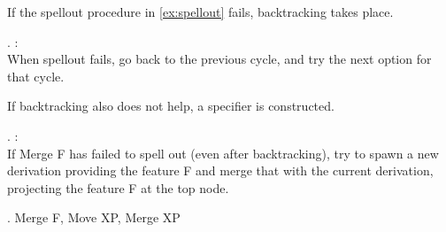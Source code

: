 If the spellout procedure in \ref{ex:spellout} fails, backtracking takes place.

\ex.  \citep{starke2018}:\\
When spellout fails, go back to the previous cycle, and try the next option for that cycle.\label{ex:backtracking}

If backtracking also does not help, a specifier is constructed.

\ex.  \citep{starke2018}:\\
If Merge F has failed to spell out (even after backtracking), try to spawn a new derivation providing the feature F and merge that with the current derivation, projecting the feature F at the top node.\label{ex:specformation}

\ex. Merge F, Move XP, Merge XP

\phantom{hi}
